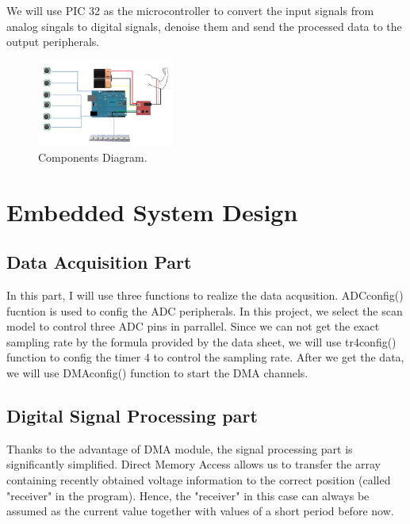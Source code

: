 \documentclass[12pt]{article}
\begin{document}
We will use PIC 32 as the microcontroller to convert the input signals from analog singals to digital signals, denoise them and send the processed data to the output peripherals.

\begin{figure}[H]
\centering
\includegraphics[width=0.4\textwidth]{hardware-diagram.png}
\caption{Components Diagram.}
\end{figure}

\newpage
\section{Embedded System Design}
\subsection{Data Acquisition Part}

In this part, I will use three functions to realize the data acqusition. ADCconfig() fucntion is used to config the ADC peripherals. In this project, we select the scan model to control three ADC pins in parrallel. Since we can not get the exact sampling rate by the formula provided by the data sheet, we will use tr4config() function to config the timer 4 to control the sampling rate. After we get the data, we will use DMAconfig() function to start the DMA channels.

\subsection{Digital Signal Processing part}
Thanks to the advantage of DMA module, the signal processing part is significantly simplified. Direct Memory Access allows us to transfer the array containing recently obtained voltage information to the correct position (called "receiver" in the program). Hence, the "receiver" in this case can always be assumed as the current value together with values of a short period before now. 
\end{document}
